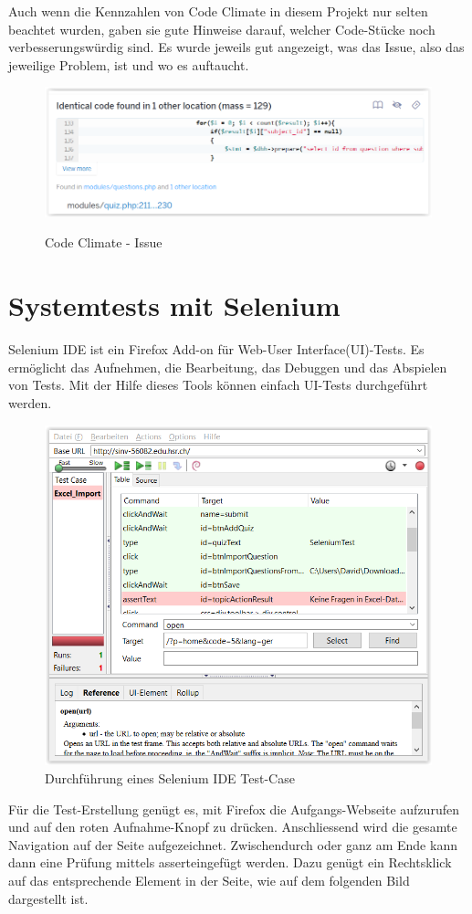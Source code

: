 Auch wenn die Kennzahlen von Code Climate in diesem Projekt nur selten beachtet wurden, gaben sie gute Hinweise darauf, welcher Code-Stücke noch verbesserungswürdig sind. Es wurde jeweils gut angezeigt, was das Issue, also das jeweilige Problem, ist und wo es auftaucht.

\begin{figure}[H]
	\centering
	\includegraphics[width=.7\textwidth]{Images/CodeClimate_Issue.PNG}
	\caption{Code Climate - Issue}
	\cite{codeclimate.com}
\end{figure}



\section{Systemtests mit Selenium}
Selenium IDE \cite{seleniumIDE} ist ein Firefox \cite{firefox} \gls{Add-on} für Web-\gls{User Interface}(UI)-Tests. Es ermöglicht das Aufnehmen, die Bearbeitung, das Debuggen und das Abspielen von Tests.
Mit der Hilfe dieses Tools können einfach \acrshort{UI}-Tests durchgeführt werden.

\begin{figure}[H]
	\centering
	\includegraphics[width=.5\textwidth]{Images/seleniumTest.PNG}
	\caption{Durchführung eines Selenium IDE Test-Case}
\end{figure}

Für die Test-Erstellung genügt es, mit Firefox die Aufgangs-Webseite aufzurufen und auf den roten Aufnahme-Knopf zu drücken. Anschliessend wird die gesamte Navigation auf der Seite aufgezeichnet. Zwischendurch oder ganz am Ende kann dann eine Prüfung mittels \glqq assert\grqq eingefügt werden. Dazu genügt ein Rechtsklick auf das entsprechende Element in der Seite, wie auf dem folgenden Bild dargestellt ist.

